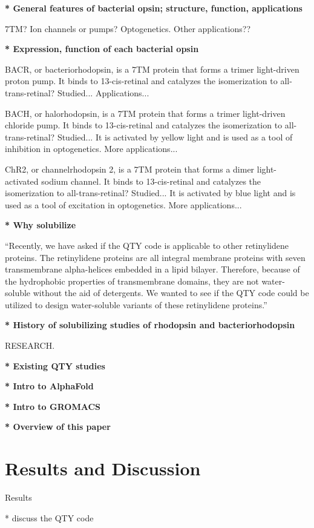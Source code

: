 \documentclass[fleqn,10pt,lineno]{manuscript}
\begin{document}
\textbf{* General features of bacterial opsin; structure, function, applications}

7TM? 
Ion channels or pumps? 
Optogenetics. 
Other applications??

\textbf{* Expression, function of each bacterial opsin}

BACR, or bacteriorhodopsin, is a 7TM protein that forms a trimer light-driven proton pump. It binds to 13-cis-retinal and catalyzes the isomerization to all-trans-retinal? Studied... Applications...

BACH, or halorhodopsin, is a 7TM protein that forms a trimer light-driven chloride pump. It binds to 13-cis-retinal and catalyzes the isomerization to all-trans-retinal? Studied... It is activated by yellow light and is used as a tool of inhibition in optogenetics. More applications...

ChR2, or channelrhodopsin 2, is a 7TM protein that forms a dimer light-activated sodium channel. It binds to 13-cis-retinal and catalyzes the isomerization to all-trans-retinal? Studied... It is activated by blue light and is used as a tool of excitation in optogenetics. More applications...

\textbf{* Why solubilize}

“Recently, we have asked if the QTY code is applicable to other retinylidene proteins. The retinylidene proteins are all integral membrane proteins with seven transmembrane alpha-helices embedded in a lipid bilayer. Therefore, because of the hydrophobic properties of transmembrane domains, they are not water-soluble without the aid of detergents. We wanted to see if the QTY code could be utilized to design water-soluble variants of these retinylidene proteins.”

\textbf{* History of solubilizing studies of rhodopsin and bacteriorhodopsin}

RESEARCH. 

\textbf{* Existing QTY studies}

\textbf{* Intro to AlphaFold}

\textbf{* Intro to GROMACS}

\textbf{* Overview of this paper}

\section*{Results and Discussion}

Results

* discuss the QTY code
\end{document}
